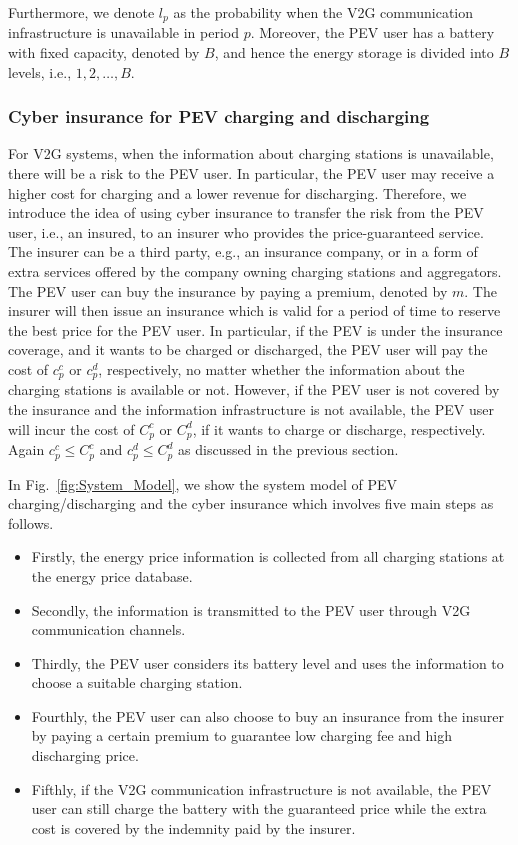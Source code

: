 \documentclass[twocolumn,10pt]{IEEEtran}
\begin{document}
Furthermore, we denote $l_p$ as the probability when the V2G communication infrastructure is unavailable in period $p$. Moreover, the PEV user has a battery with fixed capacity, denoted by $B$, and hence the energy storage is divided into $B$ levels, i.e., $1,2,\ldots, B$. 

\subsubsection{Cyber insurance for PEV charging and discharging} 

For V2G systems, when the information about charging stations is unavailable, there will be a risk to the PEV user. In particular, the PEV user may receive a higher cost for charging and a lower revenue for discharging. Therefore, we introduce the idea of using cyber insurance to transfer the risk from the PEV user, i.e., an insured, to an insurer who provides the price-guaranteed service. The insurer can be a third party, e.g., an insurance company, or in a form of extra services offered by the company owning charging stations and aggregators. The PEV user can buy the insurance by paying a premium, denoted by $m$. The insurer will then issue an insurance which is valid for a period of time to reserve the best price for the PEV user. In particular, if the PEV is under the insurance coverage, and it wants to be charged or discharged, the PEV user will pay the cost of $c^{c}_p$ or $c^{d}_p$, respectively, no matter whether the information about the charging stations is available or not. However, if the PEV user is not covered by the insurance and the information infrastructure is not available, the PEV user will incur the cost of $C^{c}_p$ or $C^{d}_p$, if it wants to charge or discharge, respectively. Again $c^{c}_p \leq C^{c}_p$ and $c^{d}_p \leq C^{d}_p$ as discussed in the previous section. 

In Fig.~\ref{fig:System_Model}, we show the system model of PEV charging/discharging and the cyber insurance which involves five main steps as follows.

\begin{itemize}
\item Firstly, the energy price information is collected from all charging stations at the energy price database.
\item Secondly, the information is transmitted to the PEV user through V2G communication channels.
\item Thirdly, the PEV user considers its battery level and uses the information to choose a suitable charging station. 
\item Fourthly, the PEV user can also choose to buy an insurance from the insurer by paying a certain premium to guarantee low charging fee and high discharging price.
\item Fifthly, if the V2G communication infrastructure is not available, the PEV user can still charge the battery with the guaranteed price while the extra cost is covered by the indemnity paid by the insurer.
\end{itemize}
\end{document}
